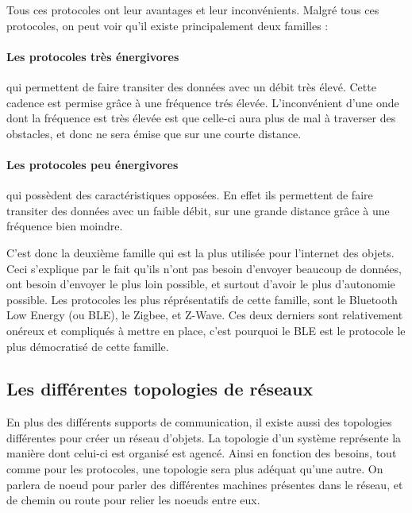 Tous ces protocoles ont leur avantages et leur inconvénients. Malgré tous ces protocoles, on peut voir qu'il 
existe principalement deux familles :

\paragraph{Les protocoles très énergivores}qui permettent de faire transiter des données avec un débit très 
élevé. Cette cadence est permise grâce à une fréquence trés élevée. L'inconvénient d'une onde dont la 
fréquence est très élevée est que celle-ci aura plus de mal à traverser des obstacles, et donc ne sera émise 
que sur une courte distance.

\paragraph{Les protocoles peu énergivores}qui possèdent des caractéristiques opposées. En effet ils 
permettent de faire transiter des données avec un faible débit, sur une grande distance grâce à une fréquence 
bien moindre.

C'est donc la deuxième famille qui est la plus utilisée pour l'internet des objets. Ceci s'explique par le 
fait qu'ils n'ont pas besoin d'envoyer beaucoup de données, ont besoin d'envoyer le plus loin possible, et 
surtout d'avoir le plus d'autonomie possible. Les protocoles les plus réprésentatifs de cette famille, sont le 
Bluetooth Low Energy (ou BLE), le Zigbee, et Z-Wave. Ces deux derniers sont relativement onéreux et compliqués 
à mettre en place, c'est pourquoi le BLE est le protocole le plus démocratisé de cette famille.

	\subsection{Les différentes topologies de réseaux}
En plus des différents supports de communication, il existe aussi des topologies différentes pour créer un 
réseau d'objets. La topologie d'un système représente la manière dont celui-ci est organisé est agencé. Ainsi 
en fonction des besoins, tout comme pour les protocoles, une topologie sera plus adéquat qu'une autre. On 
parlera de noeud pour parler des différentes machines présentes dans le réseau, et de chemin ou route pour 
relier les noeuds entre eux.

